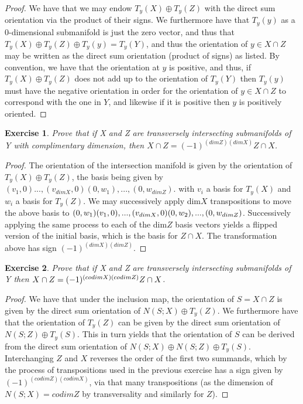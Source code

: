 \documentclass{article}
\newtheorem{exercise}{Exercise}
\begin{document}
\begin{proof}
  We have that we may endow $T_{y}(X) \oplus T_{y}(Z)$ with the direct sum orientation via the product of their signs. We furthermore have that $T_{y}(y)$ as a 0-dimensional submanifold is just the zero vector, and thus that $T_{y}(X) \oplus T_{y}(Z) \oplus T_{y}(y) = T_{y}(Y)$, and thus the orientation of $y \in X \cap Z$ may be written as the direct sum orientation (product of signs) as listed. By convention, we have that the orientation at $y$ is positive, and thus, if $T_{y}(X) \oplus T_{y}(Z)$ does not add up to the orientation of $T_{y}(Y)$ then $T_{y}(y)$ must have the negative orientation in order for the orientation of $y \in X \cap Z$ to correspond with the one in $Y$, and likewise if it is positive then $y$ is positively oriented.  
\end{proof}

\begin{exercise}
Prove that if X and Z are transversely intersecting submanifolds of Y with complimentary dimension, then $X \cap Z = (-1)^{(dimZ)(dimX)} Z \cap X$.   
\end{exercise}

\begin{proof}
  The orientation of the intersection manifold is given by the orientation of $T_{y}(X) \oplus T_{y}(Z)$, the basis being given by $(v_{1},0)...,(v_{dimX}, 0)(0, w_{1}),...,(0,w_{dimZ})$. with $v_{i}$ a basis for $T_{y}(X)$ and $w_{i}$ a basis for $T_{y}(Z)$. We may successively apply dim$X$ transpositions to move the above basis to $(0,w_{1})(v_{1},0),...,(v_{dimX},0)(0,w_{2}),...,\\ (0,w_{dimZ})$. Successively applying the same process to each of the dim$Z$ basis vectors yields a flipped version of the initial basis, which is the basis for $Z \cap X$. The transformation above has sign $(-1)^{(dimX)(dimZ)}$. 
\end{proof}

\begin{exercise}
  Prove that if X and Z are transversely intersecting submanifolds of Y then $X \cap Z = \\ (-1)^{(codimX)(codimZ)}Z\cap X$.
\end{exercise}

\begin{proof}
  We have that under the inclusion map, the orientation of $S = X \cap Z$ is given by the direct sum orientation of $N(S; X) \oplus T_{y}(Z)$. We furthermore have that the orientation of $T_{y}(Z)$ can be given by the direct sum orientation of $N(S; Z) \oplus T_{y}(S)$. This in turn yields that the orientation of $S$ can be derived from the direct sum orientation of $N(S; X) \oplus N(S; Z) \oplus T_{y}(S)$. Interchanging $Z$ and $X$ reverses the order of the first two summands, which by the process of transpositions used in the previous exercise has a sign given by $(-1)^{(codimZ)(codimX)}$, via that many transpositions (as the dimension of $N(S; X) = codim Z$ by transversality and similarly for $Z$).
\end{proof}
\end{document}
